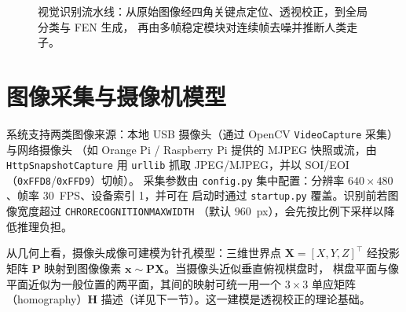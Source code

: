 \documentclass[UTF8, a4paper, 11pt, openany]{ctexbook}
\renewcommand{\_}{\textunderscore\allowbreak}
\begin{document}
\begin{figure}[H]
\centering
{}
\caption{视觉识别流水线：从原始图像经四角关键点定位、透视校正，到全局分类与 FEN 生成，
再由多帧稳定模块对连续帧去噪并推断人类走子。}
\label{fig:pipeline}
\end{figure}

\section{图像采集与摄像机模型}
\label{sec:camera}
系统支持两类图像来源：本地 USB 摄像头（通过 OpenCV \texttt{VideoCapture} 采集）与网络摄像头
（如 Orange Pi / Raspberry Pi 提供的 MJPEG 快照或流，由 \texttt{HttpSnapshotCapture} 用
\texttt{urllib} 抓取 JPEG/MJPEG，并以 SOI/EOI（\texttt{0xFFD8}/\texttt{0xFFD9}）切帧）\cite{bradski2000opencv}。
采集参数由 \texttt{config.py} 集中配置：分辨率 $640\times480$、帧率 $30$~FPS、设备索引 1，并可在
启动时通过 \texttt{startup.py} 覆盖。识别前若图像宽度超过 \texttt{CHRO\_RECOGNITION\_MAX\_WIDTH}
（默认 $960$~px），会先按比例下采样以降低推理负担。

从几何上看，摄像头成像可建模为针孔模型：三维世界点 $\mathbf{X}=[X,Y,Z]^{\top}$ 经投影矩阵
$\mathbf{P}$ 映射到图像像素 $\mathbf{x}\sim\mathbf{P}\mathbf{X}$。当摄像头近似垂直俯视棋盘时，
棋盘平面与像平面近似为一般位置的两平面，其间的映射可统一用一个 $3\times3$ 单应矩阵
（homography）$\mathbf{H}$ 描述（详见下一节）。这一建模是透视校正的理论基础\cite{hartley2004mvp}。
\end{document}

